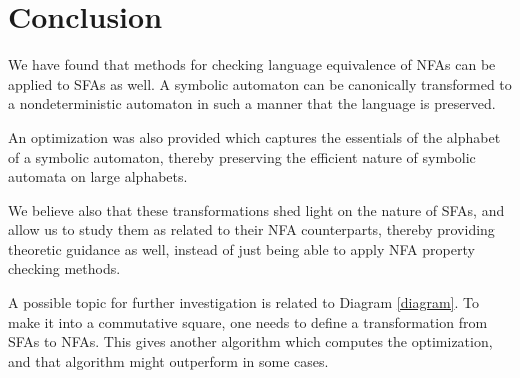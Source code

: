 
\section{Conclusion}

We have found that methods for checking language equivalence of NFAs can be applied to SFAs as well. A symbolic automaton can be canonically transformed to a nondeterministic automaton in such a manner that the language is preserved.

An optimization was also provided which captures the essentials of the alphabet of a symbolic automaton, thereby preserving the efficient nature of symbolic automata on large alphabets.

We believe also that these transformations shed light on the nature of SFAs, and allow us to study them as related to their NFA counterparts, thereby providing theoretic guidance as well, instead of just being able to apply NFA property checking methods.

A possible topic for further investigation is related to Diagram \ref{diagram}. To make it into a commutative square, one needs to define a transformation from SFAs to NFAs. This gives another algorithm which computes the optimization, and that algorithm might outperform in some cases.